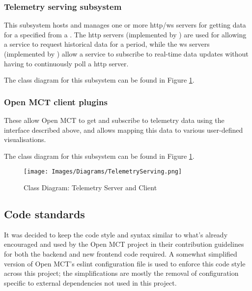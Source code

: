 \subsubsection{Telemetry serving subsystem}
This subsystem hosts and manages one or more \acrshort{http}/\Gls{ws} servers for getting data for a specified  from a . The \acrshort{http} servers (implemented by ) are used for allowing a service to request historical data for a period, while the \Gls{ws} servers (implemented by ) allow a service to subscribe to real-time data updates without having to continuously poll a \acrshort{http} server.

The class diagram for this subsystem can be found in Figure \ref{fig:cdserving}.

\subsubsection{Open MCT client plugins}
These allow Open MCT to get and subscribe to telemetry data using the interface described above, and allows mapping this data to various user-defined visualisations.

The class diagram for this subsystem can be found in Figure \ref{fig:cdserving}.

\begin{figure}[H]
  \centering
  \texttt{[image: Images/Diagrams/TelemetryServing.png]}
  \caption{Class Diagram: Telemetry Server and Client}
  \label{fig:cdserving}
\end{figure}

\subsection{Code standards}
It was decided to keep the code style and syntax similar to what’s already encouraged and used by the Open MCT project in their contribution guidelines \cite{omct_contributing} for both the \gls{backend} and new \gls{frontend} code required. A somewhat simplified version of Open MCT’s \Gls{eslint} configuration file is used to enforce this code style across this project; the simplifications are mostly the removal of configuration specific to external dependencies not used in this project.